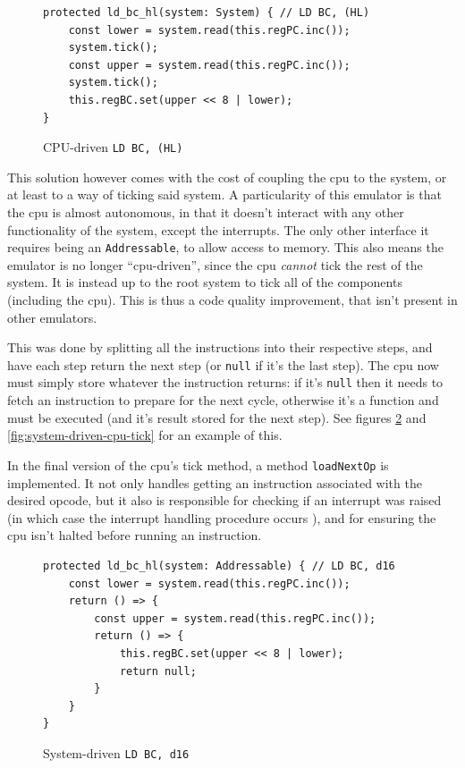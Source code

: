 \documentclass[11pt]{informatics-report}
\begin{document}
\begin{figure}[h]
    \begin{verbatim}
protected ld_bc_hl(system: System) { // LD BC, (HL)
    const lower = system.read(this.regPC.inc());
    system.tick();
    const upper = system.read(this.regPC.inc());
    system.tick();
    this.regBC.set(upper << 8 | lower);
}
    \end{verbatim}
    \caption{CPU-driven \texttt{LD BC, (HL)}}
    \label{fig:cpu-driven-ld}
\end{figure}

This solution however comes with the cost of coupling the \gls{cpu} to the system, or at least to a way of ticking said system. A particularity of this emulator is that the \gls{cpu} is almost autonomous, in that it doesn't interact with any other functionality of the system, except the interrupts. The only other interface it requires being an \texttt{Addressable}, to allow access to memory. This also means the emulator is no longer ``\gls{cpu}-driven'', since the \gls{cpu} \textit{cannot} tick the rest of the system. It is instead up to the root system to tick all of the components (including the \gls{cpu}). This is thus a code quality improvement, that isn't present in other emulators.

This was done by splitting all the instructions into their respective steps, and have each step return the next step (or \texttt{null} if it's the last step). The \gls{cpu} now must simply store whatever the instruction returns: if it's \texttt{null} then it needs to fetch an instruction to prepare for the next cycle, otherwise it's a function and must be executed (and it's result stored for the next step). See figures \ref{fig:system-driven-ld} and \ref{fig:system-driven-cpu-tick} for an example of this.

In the final version of the \gls{cpu}'s tick method, a method \texttt{loadNextOp} is implemented. It not only handles getting an instruction associated with the desired opcode, but it also is responsible for checking if an interrupt was raised (in which case the interrupt handling procedure occurs \cite[Interrupts]{pandoc}), and for ensuring the \gls{cpu} isn't halted before running an instruction.

\begin{figure}[h]
    \begin{verbatim}
protected ld_bc_hl(system: Addressable) { // LD BC, d16
    const lower = system.read(this.regPC.inc());
    return () => {
        const upper = system.read(this.regPC.inc());
        return () => {
            this.regBC.set(upper << 8 | lower);
            return null;
        }
    }
}
    \end{verbatim}
    \caption{System-driven \texttt{LD BC, d16}}
    \label{fig:system-driven-ld}
\end{figure}
\end{document}
